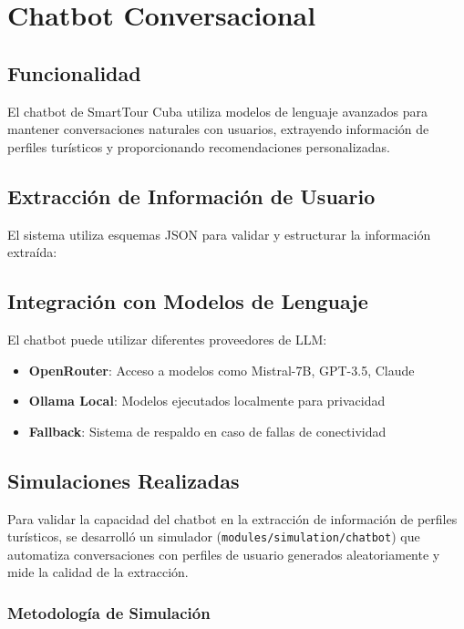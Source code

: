 \documentclass[runningheads]{llncs}
\begin{document}
\section{Chatbot Conversacional}

\subsection{Funcionalidad}

El chatbot de SmartTour Cuba utiliza modelos de lenguaje avanzados para mantener conversaciones naturales con usuarios, extrayendo información de perfiles turísticos y proporcionando recomendaciones personalizadas.


\subsection{Extracción de Información de Usuario}

El sistema utiliza esquemas JSON para validar y estructurar la información extraída:


\subsection{Integración con Modelos de Lenguaje}

El chatbot puede utilizar diferentes proveedores de LLM:

\begin{itemize}
\item \textbf{OpenRouter}: Acceso a modelos como Mistral-7B, GPT-3.5, Claude
\item \textbf{Ollama Local}: Modelos ejecutados localmente para privacidad
\item \textbf{Fallback}: Sistema de respaldo en caso de fallas de conectividad
\end{itemize}

\subsection{Simulaciones Realizadas}

Para validar la capacidad del chatbot en la extracción de información de perfiles turísticos, se desarrolló un simulador (\texttt{modules/simulation/chatbot}) que automatiza conversaciones con perfiles de usuario generados aleatoriamente y mide la calidad de la extracción.

\subsubsection{Metodología de Simulación}
\end{document}
